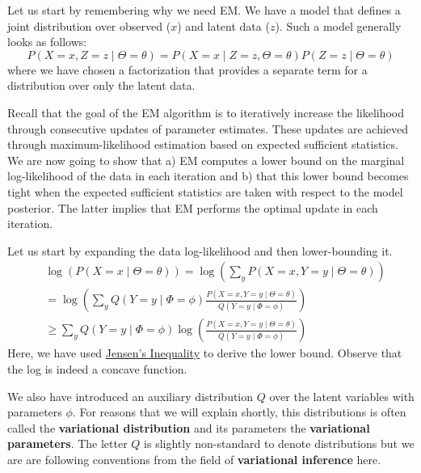 \documentclass[11pt,leqno,a4paper]{report}\usepackage[]{graphicx}\usepackage[]{color}
\begin{document}
Let us start by remembering why we need EM. We have a model that defines a joint distribution
over observed ($ x $) and latent data ($ z $). Such a model generally looks as follows:
\begin{equation}
P(X=x, Z=z  \mid  \Theta = \theta) = P(X=x \mid Z=z, \Theta=\theta) P(Z=z \mid \Theta = \theta)
\end{equation}
where we have chosen a factorization that provides a separate term for a distribution over only the
latent data.

Recall that the goal of the EM algorithm is to iteratively increase the likelihood through consecutive
updates of parameter estimates. These updates are achieved through maximum-likelihood estimation based
on expected sufficient statistics. We are now going to show that a) EM computes a lower bound on the
marginal log-likelihood of the data in each iteration and b) that this lower bound becomes tight when the
expected sufficient statistics are taken with respect to the model posterior. The latter implies that
EM performs the optimal update in each iteration.

Let us start by expanding the data log-likelihood and then lower-bounding it.
\begin{align}
&\log(P(X=x \mid \Theta=\theta)) = \log(\sum_y P(X=x, Y=y \mid  \Theta = \theta))  \\
&= \log\left(\sum_{y} Q(Y=y \mid \Phi=\phi)\frac{P(X=x, Y=y \mid  \Theta = \theta)}{Q(Y=y \mid \Phi=\phi)}\right) \\
&\geq \sum_{y} Q(Y=y \mid \Phi=\phi) \log\left(\frac{P(X=x, Y=y \mid  \Theta = \theta)}{Q(Y=y \mid \Phi=\phi)}\right)
\label{eq:ELBO1}
\end{align}
Here, we have used \href{https://en.wikipedia.org/wiki/Jensen\%27s_inequality}{Jensen's Inequality} to
derive the lower bound. Observe that the log is indeed a concave function. 

We also have introduced
an auxiliary distribution $ Q $ over the latent variables with parameters $ \phi $. 
For reasons that we will explain shortly,
this distributions is often called the \textbf{variational distribution} and its parameters the
\textbf{variational parameters}. The letter $ Q $ is slightly non-standard to denote distributions but
we are are following conventions from the field of \textbf{variational inference} here.
\end{document}
